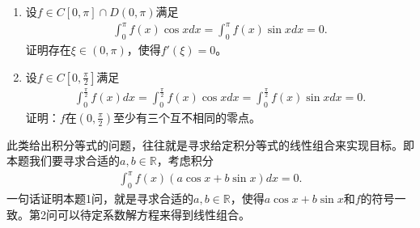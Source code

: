 \documentclass[../../main.tex]{subfiles}
\begin{document}
\begin{example}
\begin{enumerate}
\item 设$f\in C[0,\pi]\cap D(0,\pi)$满足
\begin{align*}
\int_0^\pi f(x)\cos xdx = \int_0^\pi f(x)\sin xdx = 0.
\end{align*}
证明存在$\xi\in(0,\pi)$，使得$f'(\xi)=0$。

\item 设$f\in C[0,\frac{\pi}{2}]$满足
\begin{align}\label{example0.12-11.64}
\int_0^{\frac{\pi}{2}} f(x)dx = \int_0^{\frac{\pi}{2}} f(x)\cos xdx = \int_0^{\frac{\pi}{2}} f(x)\sin xdx = 0.
\end{align}
证明：$f$在$(0,\frac{\pi}{2})$至少有三个互不相同的零点。
\end{enumerate}
\end{example}
\begin{note}
此类给出积分等式的问题，往往就是寻求给定积分等式的线性组合来实现目标。即本题我们要寻求合适的$a,b\in\mathbb{R}$，考虑积分
\begin{align*}
\int_0^\pi f(x)(a\cos x + b\sin x)dx = 0.
\end{align*}
一句话证明本题1问，就是寻求合适的$a,b\in\mathbb{R}$，使得$a\cos x + b\sin x$和$f$的符号一致。第2问可以待定系数解方程来得到线性组合。
\end{note}
\end{document}
